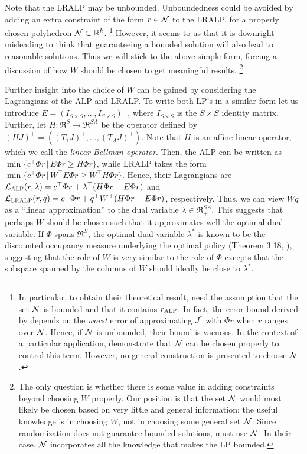 \documentclass[twocolumn]{IEEEtran}
\begin{document}
Note that the LRALP may be unbounded.
Unboundedness could be avoided by adding an extra constraint of the form $r\in \mathcal{N}$ to the LRALP,
for a properly chosen polyhedron $\mathcal{N} \subset \mathbb{R}^k$.%
\footnote{
In particular, to obtain their theoretical result, \citet{CS} need the assumption that the set $\mathcal{N}$
is bounded and that it contains $r_{\text{\sc ALP}}$. In fact,
the error bound derived by \citeauthor{CS} depends on the \emph{worst}
error of approximating $J^*$ with $\Phi r$ when
$r$ ranges over $\mathcal{N}$. Hence, if $\mathcal{N}$ is unbounded, their bound is vacuous. In the context of a particular application,
\citet{CS} demonstrate that $\mathcal{N}$ can be chosen properly to control this term.
However, no general construction is presented to choose $\mathcal{N}$.}
However, it seems to us that it is downright misleading to think that guaranteeing a bounded solution
will also lead to reasonable solutions.
Thus we will stick to the above simple form, forcing a discussion of how $W$ should be chosen to get meaningful results.%
\footnote{
The only question is whether there is some value in adding constraints beyond choosing $W$ properly.
Our position is that the set $\mathcal{N}$ would most likely be chosen based on very little and general information;
the useful knowledge is in choosing $W$, not in choosing some general set $\mathcal{N}$.
Since randomization does not guarantee bounded solutions, \citet{ALP} must use $\mathcal{N}$:
In their case, $\mathcal{N}$ incorporates
all the knowledge that makes the LP bounded.
}

Further insight into the choice of $W$ can be gained by
considering the Lagrangians of the ALP and LRALP. To write both LP's in a similar form let us introduce $E = (I_{S\times S},\dots,I_{S\times S})^\top$, where $I_{S\times S}$ is the $S\times S$ identity matrix. Further, let $H:\Re^S \to \Re^{SA}$ be the operator defined by $(HJ)^\top = ( (T_1 J)^\top, \dots, (T_A J)^\top )$. Note that $H$ is an affine linear operator, which we call the \emph{linear Bellman operator}.
Then, the ALP can be written as $\min\{ c^\top \Phi r \,|\, E \Phi r \ge H \Phi r \}$, while LRALP takes the form
$\min\{ c^\top \Phi r \,|\, W^\top E \Phi r \ge W^\top H \Phi r \}$.
Hence, their Lagrangians are $\mathcal{L}_{\text{\sc ALP}}(r,\lambda) = c^\top \Phi r+\lambda^\top (H\Phi r-E\Phi r)$ and
$\mathcal{L}_{\text{\sc LRALP}}(r,q) = c^\top \Phi r+q^\top W^\top (H\Phi r-E\Phi r)$, respectively. Thus, we can view $W q$ as a ``linear approximation''
to the dual variable $\lambda \in \Re_+^{SA}$.
This suggests that perhaps $W$ should be chosen such that it approximates well the optimal dual variable.
If $\Phi$ spans $\Re^{S}$, the optimal dual variable $\lambda^*$ is known to be the discounted occupancy measure underlying the optimal policy (Theorem 3.18, \cite{Kall17}), suggesting that the role of $W$ is very similar to the role of $\Phi$ excepts that the subspace spanned by the columns of $W$ should ideally be close to $\lambda^*$.
\end{document}
